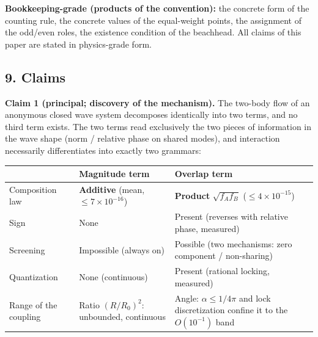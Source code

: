 \documentclass[
  a4paper,
]{article}
\newcounter{none} %
\begin{document}
\textbf{Bookkeeping-grade (products of the convention):} the concrete
form of the counting rule, the concrete values of the equal-weight
points, the assignment of the odd/even roles, the existence condition of
the beachhead. All claims of this paper are stated in physics-grade
form.

\subsection{9. Claims}\label{claims}

\textbf{Claim 1 (principal; discovery of the mechanism).} The two-body
flow of an anonymous closed wave system decomposes identically into two
terms, and no third term exists. The two terms read exclusively the two
pieces of information in the wave shape (norm / relative phase on shared
modes), and interaction necessarily differentiates into exactly two
grammars:

{\def\LTcaptype{none} %
\begin{longtable}[]{@{}
  >{\raggedright\arraybackslash}p{}
  >{\raggedright\arraybackslash}p{}
  >{\raggedright\arraybackslash}p{}@{}}
\toprule\noalign{}
\begin{minipage}[b]{\linewidth}\raggedright
\end{minipage} & \begin{minipage}[b]{\linewidth}\raggedright
Magnitude term
\end{minipage} & \begin{minipage}[b]{\linewidth}\raggedright
Overlap term
\end{minipage} \\
\midrule\noalign{}
\endhead
\bottomrule\noalign{}
\endlastfoot
Composition law & \textbf{Additive} (mean, \(\le7\times10^{-16}\)) &
\textbf{Product} \(\sqrt{f_Af_B}\) (\(\le4\times10^{-15}\)) \\
Sign & None & Present (reverses with relative phase, measured) \\
Screening & Impossible (always on) & Possible (two mechanisms: zero
component / non-sharing) \\
Quantization & None (continuous) & Present (rational locking,
measured) \\
Range of the coupling & Ratio \((R/R_0)^2\): unbounded, continuous &
Angle: \(\alpha\le1/4\pi\) and lock discretization confine it to the
\(O(10^{-1})\) band \\
\end{longtable}
}
\end{document}
